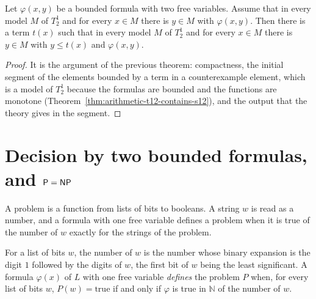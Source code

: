 \begin{theorem}
  \label{thm:arithmetic-parikh-t12}
  \leanok
  Let $\varphi(x, y)$ be a bounded formula with two free variables. Assume that in every model $M$ of
  $T^1_2$ and for every $x \in M$ there is $y \in M$ with $\varphi(x, y)$. Then there is a term $t(x)$
  such that in every model $M$ of $T^1_2$ and for every $x \in M$ there is $y \in M$ with $y \le t(x)$
  and $\varphi(x, y)$.
\end{theorem}

\begin{proof}
  \leanok
  It is the argument of the previous theorem: compactness, the initial segment of the elements
  bounded by a term in a counterexample element, which is a model of $T^1_2$ because the formulas
  are bounded and the functions are monotone (Theorem~\ref{thm:arithmetic-t12-contains-s12}), and
  the output that the theory gives in the segment.
\end{proof}

\section{Decision by two bounded formulas, and $\mathsf{P} = \mathsf{NP}$}
\label{sec:arithmetic-delta}

A problem is a function from lists of bits to booleans. A string $w$ is read as a number, and a
formula with one free variable defines a problem when it is true of the number of $w$ exactly for
the strings of the problem.

\begin{definition}
  \label{def:arithmetic-defines}
  \leanok
  \own{}
  \infrastructure{}
  For a list of bits $w$, the number of $w$ is the number whose binary expansion is the digit $1$
  followed by the digits of $w$, the first bit of $w$ being the least significant. A formula
  $\varphi(x)$ of $L$ with one free variable \emph{defines} the problem $P$ when, for every list of
  bits $w$, $P(w) = \mathrm{true}$ if and only if $\varphi$ is true in $\mathbb{N}$ of the number of
  $w$.
\end{definition}

